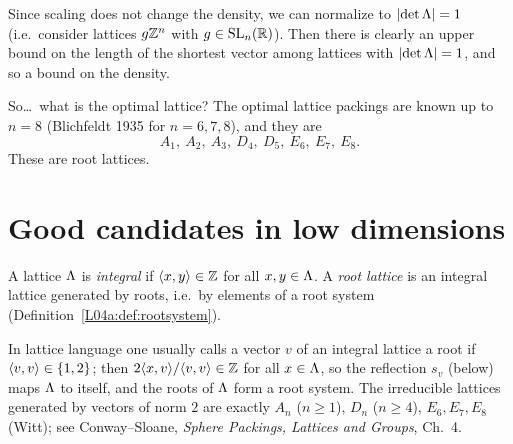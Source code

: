 Since scaling does not change the density, we can normalize to $\left\lvert \det\Lambda \right\rvert=1$ (i.e.\ consider
lattices $g\mathbb{Z}^n$ with $g\in\mathrm{SL}_n(\mathbb{R})$).
Then there is clearly an upper bound on the length of the shortest vector among lattices with
$\left\lvert \det\Lambda \right\rvert=1$, and so a bound on the density.

So\dots\ what is the optimal lattice? The optimal lattice packings are known up to $n=8$
(Blichfeldt 1935 for $n=6,7,8$), and they are
\[
  A_1,\ A_2,\ A_3,\ D_4,\ D_5,\ E_6,\ E_7,\ E_8 .
\]
These are root lattices.

\section{Good candidates in low dimensions}
\label{L04a:sec:4.2}

\begin{definition}\label{L04a:def:integral}
A lattice $\Lambda$ is \emph{integral} if $\langle x, y\rangle\in\mathbb{Z}$ for all $x,y\in\Lambda$.
A \emph{root lattice} is an integral lattice generated by roots, i.e.\ by elements of a root system
(Definition~\ref{L04a:def:rootsystem}).
\end{definition}

\begin{addedblock}
In lattice language one usually calls a vector $v$ of an integral lattice a root if
$\langle v, v\rangle\in\{1,2\}$; then $2\langle x, v\rangle/\langle v, v\rangle\in\mathbb{Z}$ for all $x\in\Lambda$, so the reflection $s_v$
(below) maps $\Lambda$ to itself, and the roots of $\Lambda$ form a root system. The irreducible lattices
generated by vectors of norm $2$ are exactly $A_n$ ($n\ge1$), $D_n$ ($n\ge4$), $E_6,E_7,E_8$ (Witt);
see Conway--Sloane, \emph{Sphere Packings, Lattices and Groups}, Ch.~4.
\end{addedblock}

